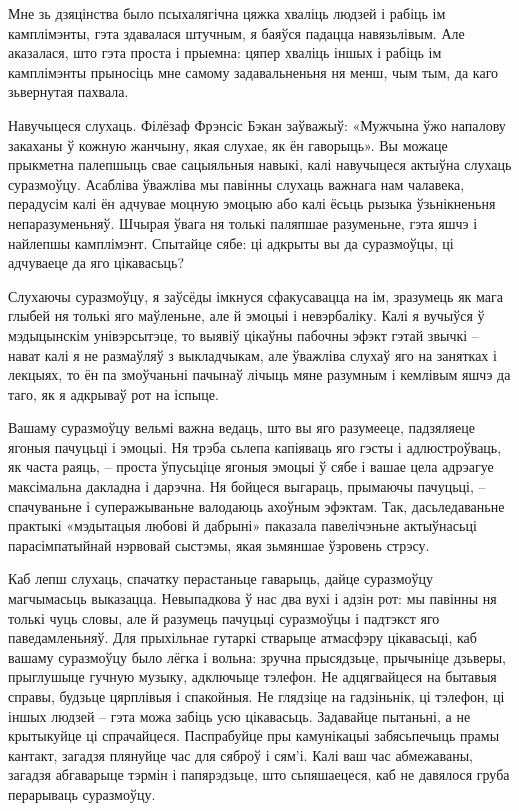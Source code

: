 Мне зь дзяцінства было псыхалягічна цяжка хваліць людзей і рабіць ім камплімэнты, гэта здавалася штучным, я баяўся падацца навязьлівым. Але аказалася, што гэта проста і прыемна: цяпер хваліць іншых і рабіць ім камплімэнты прыносіць мне самому задавальненьня ня менш, чым тым, да каго зьвернутая пахвала.

Навучыцеся слухаць. Філёзаф Фрэнсіс Бэкан заўважыў: «Мужчына ўжо напалову закаханы ў кожную жанчыну, якая слухае, як ён гаворыць». Вы можаце прыкметна палепшыць свае сацыяльныя навыкі, калі навучыцеся актыўна слухаць суразмоўцу. Асабліва ўважліва мы павінны слухаць важнага нам чалавека, перадусім калі ён адчувае моцную эмоцыю або калі ёсьць рызыка ўзьнікненьня непаразуменьняў. Шчырая ўвага ня толькі паляпшае разуменьне, гэта яшчэ і найлепшы камплімэнт. Спытайце сябе: ці адкрыты вы да суразмоўцы, ці адчуваеце да яго цікавасьць?

Слухаючы суразмоўцу, я заўсёды імкнуся сфакусавацца на ім, зразумець як мага глыбей ня толькі яго маўленьне, але й эмоцыі і невэрбаліку. Калі я вучыўся ў мэдыцынскім унівэрсытэце, то выявіў цікаўны пабочны эфэкт гэтай звычкі – нават калі я не размаўляў з выкладчыкам, але ўважліва слухаў яго на занятках і лекцыях, то ён па змоўчаньні пачынаў лічыць мяне разумным і кемлівым яшчэ да таго, як я адкрываў рот на іспыце.

Вашаму суразмоўцу вельмі важна ведаць, што вы яго разумееце, падзяляеце ягоныя пачуцьці і эмоцыі. Ня трэба сьлепа капіяваць яго гэсты і адлюстроўваць, як часта раяць, – проста ўпусьціце ягоныя эмоцыі ў сябе і вашае цела адрэагуе максімальна дакладна і дарэчна. Ня бойцеся выгараць, прымаючы пачуцьці, – спачуваньне і суперажываньне валодаюць ахоўным эфэктам. Так, дасьледаваньне практыкі «мэдытацыя любові й дабрыні» паказала павелічэньне актыўнасьці парасімпатыйнай нэрвовай сыстэмы, якая зьмяншае ўзровень стрэсу.

Каб лепш слухаць, спачатку перастаньце гаварыць, дайце суразмоўцу магчымасьць выказацца. Невыпадкова ў нас два вухі і адзін рот: мы павінны ня толькі чуць словы, але й разумець пачуцьці суразмоўцы і падтэкст яго паведамленьняў. Для прыхільнае гутаркі стварыце атмасфэру цікавасьці, каб вашаму суразмоўцу было лёгка і вольна: зручна прысядзьце, прычыніце дзьверы, прыглушыце гучную музыку, адключыце тэлефон. Не адцягвайцеся на бытавыя справы, будзьце цярплівыя і спакойныя. Не глядзіце на гадзіньнік, ці тэлефон, ці іншых людзей – гэта можа забіць усю цікавасьць. Задавайце пытаньні, а не крытыкуйце ці спрачайцеся. Паспрабуйце пры камунікацыі забясьпечыць прамы кантакт, загадзя плянуйце час для сяброў і сям'і. Калі ваш час абмежаваны, загадзя абгаварыце тэрмін і папярэдзьце, што сьпяшаецеся, каб не давялося груба перарываць суразмоўцу.


